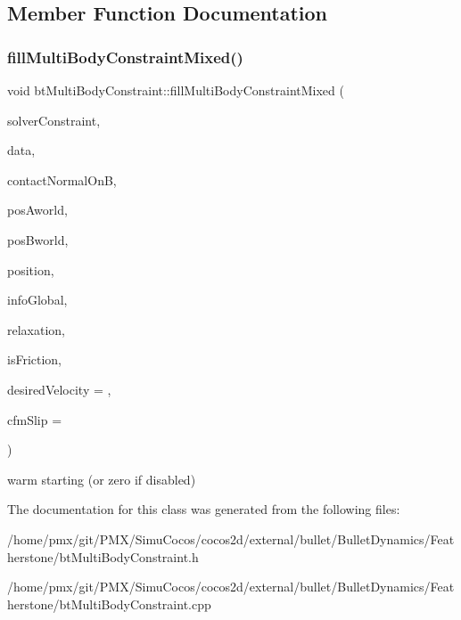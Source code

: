 \subsection{Member Function Documentation}
\mbox{\label{classbtMultiBodyConstraint_a0cdd1b0d275d96edff7accc9df216370}} 
\subsubsection{\texorpdfstring{fill\+Multi\+Body\+Constraint\+Mixed()}{fillMultiBodyConstraintMixed()}}
{\footnotesize\ttfamily void bt\+Multi\+Body\+Constraint\+::fill\+Multi\+Body\+Constraint\+Mixed (\begin{DoxyParamCaption}\item[{bt\+Multi\+Body\+Solver\+Constraint \&}]{solver\+Constraint,  }\item[{\hyperlink{structbtMultiBodyJacobianData}{bt\+Multi\+Body\+Jacobian\+Data} \&}]{data,  }\item[{const bt\+Vector3 \&}]{contact\+Normal\+OnB,  }\item[{const bt\+Vector3 \&}]{pos\+Aworld,  }\item[{const bt\+Vector3 \&}]{pos\+Bworld,  }\item[{bt\+Scalar}]{position,  }\item[{const \hyperlink{structbtContactSolverInfo}{bt\+Contact\+Solver\+Info} \&}]{info\+Global,  }\item[{bt\+Scalar \&}]{relaxation,  }\item[{bool}]{is\+Friction,  }\item[{bt\+Scalar}]{desired\+Velocity = {},  }\item[{bt\+Scalar}]{cfm\+Slip = {} }\end{DoxyParamCaption})\hspace{0.3cm}{\ttfamily [protected]}}

warm starting (or zero if disabled) 

The documentation for this class was generated from the following files\+:\begin{DoxyCompactItemize}
\item 
/home/pmx/git/\+P\+M\+X/\+Simu\+Cocos/cocos2d/external/bullet/\+Bullet\+Dynamics/\+Featherstone/bt\+Multi\+Body\+Constraint.\+h\item 
/home/pmx/git/\+P\+M\+X/\+Simu\+Cocos/cocos2d/external/bullet/\+Bullet\+Dynamics/\+Featherstone/bt\+Multi\+Body\+Constraint.\+cpp\end{DoxyCompactItemize}
